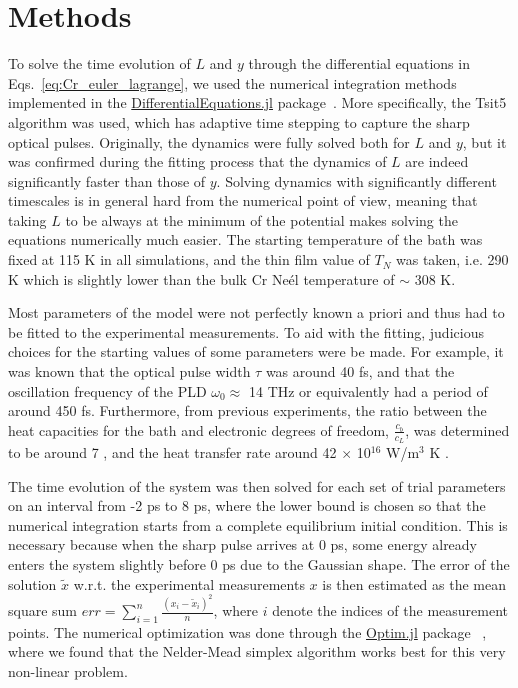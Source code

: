 \section{Methods \label{sec:Cr_Methods}}
To solve the time evolution of $L$ and $y$ through the differential equations in Eqs.~\ref{eq:Cr_euler_lagrange}, we used the numerical integration methods implemented in the \href{https://github.com/SciML/DifferentialEquations.jl}{DifferentialEquations.jl} package~\cite{rackauckas2017differentialequations}. More specifically, the Tsit5 algorithm was used, which has adaptive time stepping to capture the sharp optical pulses.
Originally, the dynamics were fully solved both for $L$ and $y$, but it was confirmed during the fitting process that the dynamics of $L$ are indeed significantly faster than those of $y$.
Solving dynamics with significantly different timescales is in general hard from the numerical point of view, meaning that taking $L$ to be always at the minimum of the potential makes solving the equations numerically much easier.
The starting temperature of the bath was fixed at 115 K in all simulations, and the thin film value of $T_N$ was taken, i.e. 290 K which is slightly lower than the bulk Cr Ne\'el temperature of $\sim$ 308 K.

Most parameters of the model were not perfectly known a priori and thus had to be fitted to the experimental measurements.
To aid with the fitting, judicious choices for the starting values of some parameters were be made.
For example, it was known that the optical pulse width $\tau$ was around 40 fs, and that the oscillation frequency of the PLD $\omega_0 \approx$ 14 THz or equivalently had a period of around 450 fs.
Furthermore, from previous experiments, the ratio between the heat capacities for the bath and electronic degrees of freedom, $\frac{c_b}{c_L}$, was determined to be around 7 \cite{Nicholson2016}, and the heat transfer rate around 42 $\times$ 10$^{16}$ W/m$^3$ K \cite{Hostetler1999}.

The time evolution of the system was then solved for each set of trial parameters on an interval from -2 ps to 8 ps, where the lower bound is chosen so that the numerical integration starts from a complete equilibrium initial condition.
This is necessary because when the sharp pulse arrives at 0 ps, some energy already enters the system slightly before 0 ps due to the Gaussian shape.
The error of the solution $\tilde{x}$ w.r.t. the experimental measurements $x$ is then estimated as the mean square sum $err = \sum_{i=1}^n \frac{(x_i - \tilde{x}_i)^2}{n}$, where $i$ denote the indices of the measurement points.
The numerical optimization was done through the \href{https://github.com/JuliaNLSolvers/Optim.jl}{Optim.jl} package ~\cite{mogensen2018optim}, where we found that the Nelder-Mead simplex algorithm \cite{Nelder1965} works best for this very non-linear problem.

